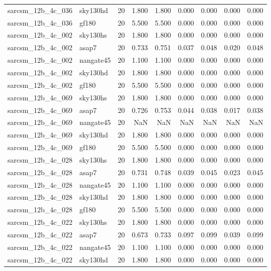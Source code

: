 \begin{tabular}{llrrrrrrr}
sarcsm\_12b\_4c\_036 & sky130hd & 20 & 1.800 & 1.800 & 0.000 & 0.000 & 0.000 & 0.000 \\
sarcsm\_12b\_4c\_036 & gf180 & 20 & 5.500 & 5.500 & 0.000 & 0.000 & 0.000 & 0.000 \\
sarcsm\_12b\_4c\_002 & sky130hs & 20 & 1.800 & 1.800 & 0.000 & 0.000 & 0.000 & 0.000 \\
sarcsm\_12b\_4c\_002 & asap7 & 20 & 0.733 & 0.751 & 0.037 & 0.048 & 0.020 & 0.048 \\
sarcsm\_12b\_4c\_002 & nangate45 & 20 & 1.100 & 1.100 & 0.000 & 0.000 & 0.000 & 0.000 \\
sarcsm\_12b\_4c\_002 & sky130hd & 20 & 1.800 & 1.800 & 0.000 & 0.000 & 0.000 & 0.000 \\
sarcsm\_12b\_4c\_002 & gf180 & 20 & 5.500 & 5.500 & 0.000 & 0.000 & 0.000 & 0.000 \\
sarcsm\_12b\_4c\_069 & sky130hs & 20 & 1.800 & 1.800 & 0.000 & 0.000 & 0.000 & 0.000 \\
sarcsm\_12b\_4c\_069 & asap7 & 20 & 0.726 & 0.753 & 0.044 & 0.038 & 0.017 & 0.038 \\
sarcsm\_12b\_4c\_069 & nangate45 & 20 & NaN & NaN & NaN & NaN & NaN & NaN \\
sarcsm\_12b\_4c\_069 & sky130hd & 20 & 1.800 & 1.800 & 0.000 & 0.000 & 0.000 & 0.000 \\
sarcsm\_12b\_4c\_069 & gf180 & 20 & 5.500 & 5.500 & 0.000 & 0.000 & 0.000 & 0.000 \\
sarcsm\_12b\_4c\_028 & sky130hs & 20 & 1.800 & 1.800 & 0.000 & 0.000 & 0.000 & 0.000 \\
sarcsm\_12b\_4c\_028 & asap7 & 20 & 0.731 & 0.748 & 0.039 & 0.045 & 0.023 & 0.045 \\
sarcsm\_12b\_4c\_028 & nangate45 & 20 & 1.100 & 1.100 & 0.000 & 0.000 & 0.000 & 0.000 \\
sarcsm\_12b\_4c\_028 & sky130hd & 20 & 1.800 & 1.800 & 0.000 & 0.000 & 0.000 & 0.000 \\
sarcsm\_12b\_4c\_028 & gf180 & 20 & 5.500 & 5.500 & 0.000 & 0.000 & 0.000 & 0.000 \\
sarcsm\_12b\_4c\_022 & sky130hs & 20 & 1.800 & 1.800 & 0.000 & 0.000 & 0.000 & 0.000 \\
sarcsm\_12b\_4c\_022 & asap7 & 20 & 0.673 & 0.733 & 0.097 & 0.099 & 0.039 & 0.099 \\
sarcsm\_12b\_4c\_022 & nangate45 & 20 & 1.100 & 1.100 & 0.000 & 0.000 & 0.000 & 0.000 \\
sarcsm\_12b\_4c\_022 & sky130hd & 20 & 1.800 & 1.800 & 0.000 & 0.000 & 0.000 & 0.000 \\

\end{tabular}
